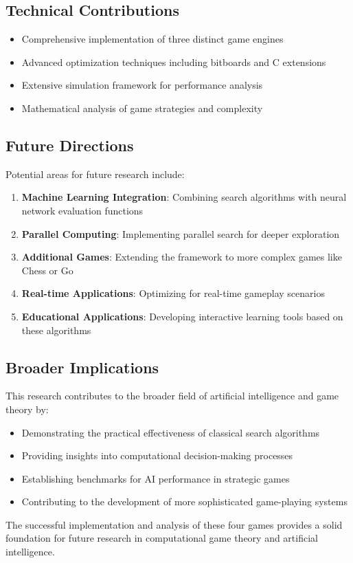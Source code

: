 \documentclass[12pt]{article}
\begin{document}
\subsection{Technical Contributions}

\begin{itemize}
    \item Comprehensive implementation of three distinct game engines
    \item Advanced optimization techniques including bitboards and C extensions
    \item Extensive simulation framework for performance analysis
    \item Mathematical analysis of game strategies and complexity
\end{itemize}

\subsection{Future Directions}

Potential areas for future research include:

\begin{enumerate}
    \item \textbf{Machine Learning Integration}: Combining search algorithms with neural network evaluation functions
    \item \textbf{Parallel Computing}: Implementing parallel search for deeper exploration
    \item \textbf{Additional Games}: Extending the framework to more complex games like Chess or Go
    \item \textbf{Real-time Applications}: Optimizing for real-time gameplay scenarios
    \item \textbf{Educational Applications}: Developing interactive learning tools based on these algorithms
\end{enumerate}

\subsection{Broader Implications}

This research contributes to the broader field of artificial intelligence and game theory by:

\begin{itemize}
    \item Demonstrating the practical effectiveness of classical search algorithms
    \item Providing insights into computational decision-making processes
    \item Establishing benchmarks for AI performance in strategic games
    \item Contributing to the development of more sophisticated game-playing systems
\end{itemize}

The successful implementation and analysis of these four games provides a solid foundation for future research in computational game theory and artificial intelligence.
\end{document}
